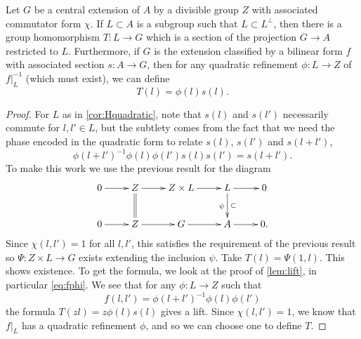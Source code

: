 \documentclass[11pt]{amsart}
\begin{document}
\begin{cor}\label{cor:Hquadratic}
Let $G$ be a central extension of $A$ by a divisible group $Z$ with associated commutator form $\chi$. If $L\subset A$ is a subgroup such that $L\subset L^\perp$,
then there is a group homomorphism $T \colon L \to G$ which is a section of the projection $G\to A$ restricted to $L$. Furthermore, if $G$ is the extension classified by a bilinear form $f$ with associated section $s \colon A \to G$, then for any quadratic refinement $\phi \colon L \to Z$ of $f|_L^{-1}$ (which must exist), we can define
\[ T(l) = \phi(l)s(l).\]
\end{cor}
\begin{proof}
For $L$ as in \cref{cor:Hquadratic}, note that $s(l)$ and $s(l')$ necessarily commute for $l,l' \in L$, but the subtlety comes from the fact that we need the phase encoded in the quadratic form to relate $s(l)$, $s(l')$ and $s(l+l')$,
\[\phi(l+l')^{-1}\phi(l)\phi(l') s(l)s(l')  = s(l+l').\]
To make this work
we use the previous result  for the diagram
\[\xymatrix{
0 \ar[r] & Z \ar[r] \ar@{=}[d] & Z\times L \ar[r] & L \ar[r]\ar[d]^-{\subset}_{\psi} & 0 \\
0 \ar[r] & Z \ar[r] & G \ar[r] & A \ar[r] & 0.
}\]
Since $\chi(l,l')=1$ for all $l,l'$, this satisfies the requirement of the previous result so $\Psi \colon  Z \times L \to G$ exists extending the inclusion $\psi$. Take $T(l) = \Psi(1,l)$. This shows existence. To get the formula,
we look at the proof of \cref{lem:lift}, in particular \eqref{eq:fphi}.
We see that for any $\phi \colon L \to Z$ such that
\[  f(l,l') = \phi(l+l')^{-1}\phi(l)\phi(l') \]
the formula $ T(zl) = z\phi(l)s(l)$ gives a lift. Since $\chi(l,l')=1$, we know that $f|_L$ has a quadratic refinement $\phi$, and so we can choose one to define $T$.
\end{proof}










\end{document}
